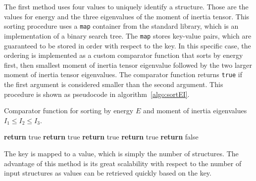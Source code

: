 The first method uses four values to uniquely identify a structure. Those are
the values for energy and the three eigenvalues of the moment of inertia tensor.
This sorting procedure uses a \verb|map| container from the \Cpp standard
library, which is an implementation of a binary search tree. The \verb|map|
stores key-value pairs, which are guaranteed to be stored in order with respect
to the key.\autocite{Stroustrup_programminglanguage_2000} In this specific case,
the ordering is implemented as a custom comparator function that sorts by energy
first, then smallest moment of inertia tensor eigenvalue followed by the two
larger moment of inertia tensor eigenvalues. The comparator function returns
\texttt{true} if the first argument is considered smaller than the second
argument. This procedure is shown as pseudocode in algorithm~\ref{algo:sortEI}. 
%
\begin{algorithm}[htp]
    \caption{Comparator function for sorting by energy $E$ and moment of inertia eigenvalues $I_1\leq I_2\leq I_3$.}
    \label{algo:sortEI}
    \begin{algorithmic}[1]
             \State \textbf{return} true
             \State \textbf{return} true
             \State \textbf{return} true
             \State \textbf{return} true
            \Else \State \textbf{return} false
            \EndIf
        \EndProcedure
    \end{algorithmic}
\end{algorithm}
%
The key is mapped to a value, which is simply the number of structures.
The advantage of this method is its great scalability with respect to the number
of input structures as values can be retrieved quickly based on the key.

